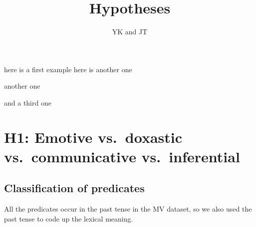 \documentclass[11pt,fleqn]{article}
\title{Hypotheses}
\author{YK and JT}
\newcommand{\6}{\mbox{$[\hspace*{-.6mm}[$}}
\newcommand{\9}{\mbox{$]\hspace*{-.6mm}]$}}
\begin{document}
\maketitle

\citealt{kiparsky-kiparsky70}

\begin{exe}
\ex here is a first example
\ex here is another one
\begin{xlist}
\ex another
\ex one
\end{xlist}
\ex and a third one
\end{exe}

\section{H1: Emotive vs.\ doxastic vs.\ communicative vs.\ inferential}

\subsection{Classification of predicates}

All the predicates occur in the past tense in the MV dataset, so we also used the past tense to code up the lexical meaning.
\end{document}
